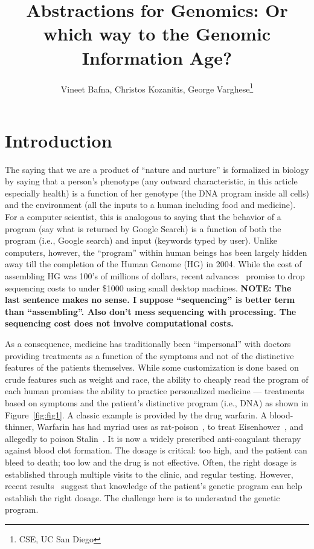 \documentclass[10pt,fullpage]{article}
\author{Vineet Bafna, Christos Kozanitis, George Varghese\thanks{CSE, UC San Diego}}
\title{Abstractions for Genomics: Or which way to the Genomic Information Age?}
\begin{document}
\maketitle


\section{Introduction}

The saying that we are a product of ``nature and nurture'' is
formalized in biology by saying that a person's phenotype (any outward
characteristic, in this article especially health) is a function of
her genotype (the DNA program inside all cells) and the environment
(all the inputs to a human including food and medicine).  For a
computer scientist, this is analogous to saying that the behavior of a
program (say what is returned by Google Search) is a function of both
the program (i.e., Google search) and input (keywords typed by user).
Unlike computers, however, the ``program'' within human beings has
been largely hidden away till the completion of the Human Genome (HG)
in 2004.  While the cost of assembling HG was 100's of millions of
dollars, recent advances~\citet{} promise to drop sequencing costs to
under \$1000 using small desktop machines. {\bf NOTE: The last sentence
makes no sense. I suppose ``sequencing'' is better term than
``assembling''. Also don't mess sequencing with processing. The
sequencing cost does not involve computational costs.}

As a consequence, medicine has traditionally been ``impersonal'' with
doctors providing treatments as a function of the symptoms and not of
the distinctive features of the patients themselves.  While some
customization is done based on crude features such as weight and race,
the ability to cheaply read the program of each human promises the
ability to practice personalized medicine --- treatments based on
symptoms and the patient's distinctive program (i.e., DNA) as shown in
Figure~\ref{fig:fig1}.  A classic example is
provided by the drug warfarin. A blood-thinner, Warfarin has had
myriad uses as rat-poison~\citet{}, to treat Eisenhower~\citet{}, and
allegedly to poison Stalin~\citet{}. It is now a widely prescribed
anti-coagulant therapy against blood clot formation. The dosage is
critical: too high, and the patient can bleed to death; too low and
the drug is not effective. Often, the right dosage is established
through multiple visits to the clinic, and regular testing. However,
recent results~\citet{} suggest that knowledge of the patient's
genetic program can help establish the right dosage. The challenge
here is to undersatnd the genetic program.
\end{document}
